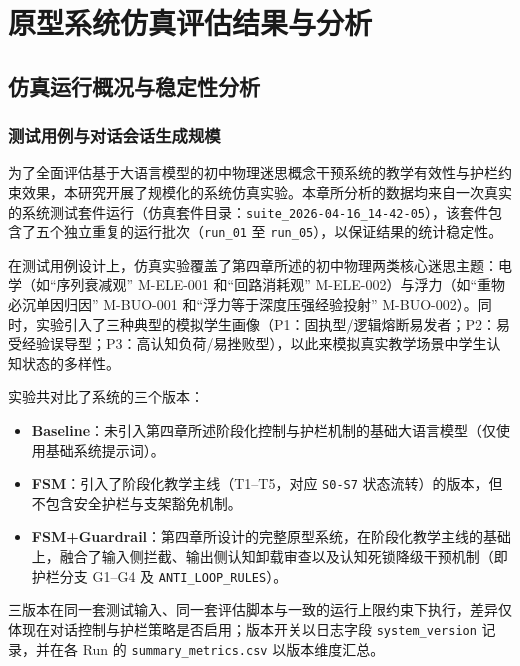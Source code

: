 
\chapter{原型系统仿真评估结果与分析}
\label{chapter:chapter05}

\section{仿真运行概况与稳定性分析}
\label{sec:5.1}

\subsection{测试用例与对话会话生成规模}
\label{subsec:5.1.1}

为了全面评估基于大语言模型的初中物理迷思概念干预系统的教学有效性与护栏约束效果，本研究开展了规模化的系统仿真实验。本章所分析的数据均来自一次真实的系统测试套件运行（仿真套件目录：\texttt{suite\_2026-04-16\_14-42-05}），该套件包含了五个独立重复的运行批次（\texttt{run\_01} 至 \texttt{run\_05}），以保证结果的统计稳定性。

在测试用例设计上，仿真实验覆盖了第四章所述的初中物理两类核心迷思主题：电学（如“序列衰减观” M-ELE-001 和“回路消耗观” M-ELE-002）与浮力（如“重物必沉单因归因” M-BUO-001 和“浮力等于深度压强经验投射” M-BUO-002）。同时，实验引入了三种典型的模拟学生画像（P1：固执型/逻辑熔断易发者；P2：易受经验误导型；P3：高认知负荷/易挫败型），以此来模拟真实教学场景中学生认知状态的多样性。

实验共对比了系统的三个版本：
\begin{itemize}
    \item \textbf{Baseline}：未引入第四章所述阶段化控制与护栏机制的基础大语言模型（仅使用基础系统提示词）。
    \item \textbf{FSM}：引入了阶段化教学主线（T1--T5，对应 \texttt{S0-S7} 状态流转）的版本，但不包含安全护栏与支架豁免机制。
    \item \textbf{FSM+Guardrail}：第四章所设计的完整原型系统，在阶段化教学主线的基础上，融合了输入侧拦截、输出侧认知卸载审查以及认知死锁降级干预机制（即护栏分支 G1--G4 及 \texttt{ANTI\_LOOP\_RULES}）。
\end{itemize}

三版本在同一套测试输入、同一套评估脚本与一致的运行上限约束下执行，差异仅体现在对话控制与护栏策略是否启用；版本开关以日志字段 \texttt{system\_version} 记录，并在各 Run 的 \texttt{summary\_metrics.csv} 以版本维度汇总。

